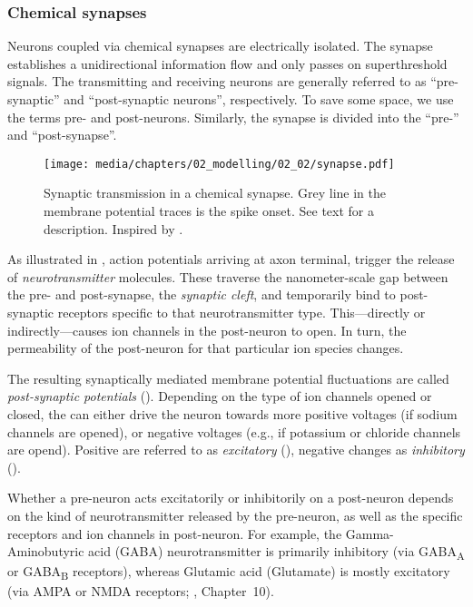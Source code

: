 \subsubsection{Chemical synapses}
Neurons coupled via chemical synapses are electrically isolated.
The synapse establishes a unidirectional information flow and only passes on superthreshold signals.
The transmitting and receiving neurons are generally referred to as \enquote{pre-synaptic} and \enquote{post-synaptic neurons}, respectively.
To save some space, we use the terms pre- and post-neurons.
Similarly, the synapse is divided into the \enquote{pre-} and \enquote{post-synapse}.

\begin{figure}
	\texttt{[image: media/chapters/02\_modelling/02\_02/synapse.pdf]}%
	\caption[Synaptic transmission in a chemical synapse]{Synaptic transmission in a chemical synapse. Grey line in the membrane potential traces is the spike onset. See text for a description. Inspired by \citet[Figure~8-8B-C, p.~185]{kandel2012principles}.}
	\label{fig:synapse}
\end{figure}

As illustrated in , action potentials arriving at axon terminal, trigger the release of \emph{neurotransmitter} molecules.
These traverse the nanometer-scale gap between the pre- and post-synapse, the \emph{synaptic cleft}, and temporarily bind to post-synaptic receptors specific to that neurotransmitter type.
This---directly or indirectly---causes ion channels in the post-neuron to open.
In turn, the permeability of the post-neuron for that particular ion species changes.

The resulting synaptically mediated membrane potential fluctuations are called \emph{post-synaptic potentials} (\PSPpl).
Depending on the type of ion channels opened or closed, the \PSP can either drive the neuron towards more positive voltages (if sodium channels are opened), or negative voltages (e.g., if potassium or chloride channels are opend).
Positive \PSPpl are referred to as \emph{excitatory} (\EPSP), negative changes as \emph{inhibitory} (\IPSP).

Whether a pre-neuron acts excitatorily or inhibitorily on a post-neuron depends on the kind of neurotransmitter released by the pre-neuron, as well as the specific receptors and ion channels in post-neuron.
For example, the Gamma-Aminobutyric acid (GABA) neurotransmitter is primarily inhibitory (via GABA\textsubscript{A} or GABA\textsubscript{B} receptors), whereas Glutamic acid (Glutamate) is mostly excitatory (via AMPA or NMDA receptors; \cite{kandel2012principles}, Chapter~10).

